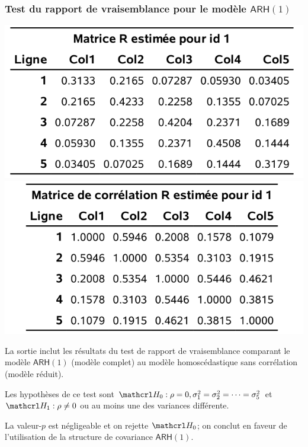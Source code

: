 \documentclass{beamer}
\begin{document}
\begin{frame}[fragile]
\frametitle{Test du rapport de vraisemblance pour le modèle $\mathsf{ARH}(1)$}
\begin{center}
\includegraphics[width = 0.45\linewidth]{img/c5/diapos6-e21a}
\includegraphics[width = 0.45\linewidth]{img/c5/diapos6-e21b}
\end{center}
\bi
\item La sortie \SASlang{} inclut les résultats du test de rapport de vraisemblance comparant le modèle $\mathsf{ARH}(1)$ (modèle complet) au modèle homoscédastique sans corrélation (modèle réduit).
\item Les hypothèses de ce test sont $\Hy_0: \rho=0, \sigma_1^2=\sigma_2^2=\cdots=\sigma_5^2$ et  $\Hy_1: \rho \neq 0$ ou au moins une des variances différente.
\item La valeur-$p$ est négligeable et on rejette $\Hy_0$; on conclut en faveur de l'utilisation de la structure de covariance $\mathsf{ARH}(1)$.
\ei
\end{frame}
\end{document}
